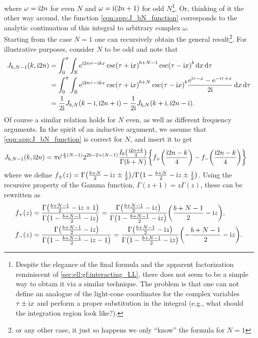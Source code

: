 where $\omega = \text{i} 2n$ for even $N$ and $\omega = \text{i} (2n+1)$ for odd $N$\footnote{Despite the elegance of the final formula and the apparent factorization reminiscent of \autoref{sec:ell:gf:interacting_LL}, there does not seem to be a simple way to obtain it via a similar technique.
The problem is that one can not define an analogue of the light-cone coordinates for the complex variables $\tau \pm \text{i} x$ and perform a proper substitution in the integral (e.g., what should the integration region look like?).}.
Or, thinking of it the other way around, the function \autoref{eqn:app:J_bN_function} corresponds to the analytic continuation of this integral to arbitrary complex $\omega$.\\
Starting from the case $N=1$ one can recursively obtain the general result\footnote{or any other case, it just so happens we only ``know'' the formula for $N=1$}.
For illustrative purposes, consider $N$ to be odd and note that
\begin{align*}
J_{b,N-1}(k,\text{i} 2n) &= \int_{0}^{\pi} \int_{\mathbb{R}} \text{e}^{\text{i} 2n\tau - \text{i} kx} \csc(\tau + \text{i} x)^{b+N-1} \csc(\tau - \text{i} x)^b \, \mathrm{d}x  \,\mathrm{d}\tau\\
&= \int_{0}^{\pi} \int_{\mathbb{R}} \text{e}^{\text{i} 2n\tau - \text{i} kx} \csc(\tau + \text{i} x)^{b+N} \csc(\tau - \text{i} x)^b \frac{\text{e}^{\text{i} \tau - x} - \text{e}^{-\text{i}\tau + x}}{2\text{i}} \, \mathrm{d}x  \,\mathrm{d}\tau\\
&= \frac{1}{2\text{i}} J_{b,N}(k-\text{i}, \text{i} 2n + \text{i}) - \frac{1}{2\text{i}} J_{b,N}(k+\text{i}, \text{i} 2n - \text{i}).
\end{align*}
Of course a similar relation holds for $N$ even, as well as different frequency arguments.
In the spirit of an inductive argument, we assume that \autoref{eqn:app:J_bN_function} is correct for $N$, and insert it to get
\begin{align*}
J_{b,N-1}(k,\i 2n) &= \pi \powe{\i \frac{\pi}{2}(N-1)} 2^{2b-2+(N-1)} \frac{I_b\kla*{\frac{\i 2n + k}{4}}}{\Gamma(b+N)} \klc*{f_+\kla*{\frac{\i 2n - k}{4}} - f_-\kla*{\frac{\i 2n - k}{4}} }
\end{align*}
where we define $f_\pm(z) = \Gamma\kla*{\frac{b+N}{2} - \i z \pm  \frac{1}{2}} / \Gamma\kla*{1-\frac{b+N}{2} - \i z \pm \frac{1}{2}}$.
Using the recursive property of the Gamma function, $\Gamma(z+1)=z\Gamma(z)$, these can be rewritten as
\begin{align*}
f_+(z) &= \frac{\Gamma\kla*{\frac{b+N-1}{2} - \i z + 1} }{\Gamma\kla*{1-\frac{b+N-1}{2} - \i z}} = \frac{\Gamma\kla*{\frac{b+N-1}{2} - \i z} }{\Gamma\kla*{1-\frac{b+N-1}{2} - \i z}} \kla*{\frac{b+N-1}{2} - \i z},\\
f_-(z) &= \frac{\Gamma\kla*{\frac{b+N-1}{2} - \i z} }{\Gamma\kla*{1-\frac{b+N-1}{2} - \i z - 1}} = \frac{\Gamma\kla*{\frac{b+N-1}{2} - \i z} }{\Gamma\kla*{1-\frac{b+N-1}{2} - \i z}} \kla*{-\frac{b+N-1}{2} - \i z}.
\end{align*}
